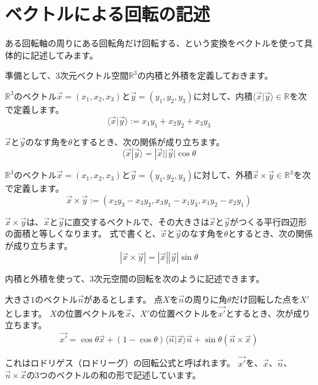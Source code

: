 \documentclass{jlreq}
\numberwithin{equation}{section}
\begin{document}
\section{ベクトルによる回転の記述}

ある回転軸の周りにある回転角だけ回転する、という変換をベクトルを使って具体的に記述してみます。

準備として、3次元ベクトル空間\(\mathbb{R}^3\)の内積と外積を定義しておきます。

\begin{definition}
    \(\mathbb{R}^3\)のベクトル\(\vec{x}=(x_1,x_2,x_3)\)と\(\vec{y}=(y_1,y_2,y_3)\)に対して、内積\(\langle\vec{x}|\vec{y}\rangle\in\mathbb{R}\)を次で定義します。
    \[
        \langle\vec{x}|\vec{y}\rangle:=x_1y_1+x_2y_2+x_3y_3
    \]
\end{definition}

\(\vec{x}\)と\(\vec{y}\)のなす角を\(\theta\)とするとき、次の関係が成り立ちます。
\[
    \langle\vec{x}|\vec{y}\rangle=|\vec{x}||\vec{y}|\cos\theta
\]

\begin{definition}
    \(\mathbb{R}^3\)のベクトル\(\vec{x}=(x_1,x_2,x_3)\)と\(\vec{y}=(y_1,y_2,y_3)\)に対して、外積\(\vec{x}\times\vec{y}\in\mathbb{R}^3\)を次で定義します。
    \[
        \vec{x}\times\vec{y}:=(x_2y_3-x_3y_2,x_3y_1-x_1y_3,x_1y_2-x_2y_1)
    \]
\end{definition}

\(\vec{x}\times\vec{y}\)は、\(\vec{x}\)と\(\vec{y}\)に直交するベクトルで、その大きさは\(\vec{x}\)と\(\vec{y}\)がつくる平行四辺形の面積と等しくなります。
式で書くと、\(\vec{x}\)と\(\vec{y}\)のなす角を\(\theta\)とするとき、次の関係が成り立ちます。
\[
    |\vec{x}\times\vec{y}|=|\vec{x}||\vec{y}|\sin\theta
\]

内積と外積を使って、3次元空間の回転を次のように記述できます。

\begin{theorem}\label{rotation_formula}
    大きさ\(1\)のベクトル\(\vec{n}\)があるとします。
    点\(X\)を\(\vec{n}\)の周りに角\(\theta\)だけ回転した点を\(X'\)とします。
    \(X\)の位置ベクトルを\(\vec{x}\)、\(X'\)の位置ベクトルを\(\vec{x'}\)とするとき、次が成り立ちます。
    \[
        \vec{x'}=\cos\theta\vec{x}+(1-\cos\theta)\langle\vec{n}|\vec{x}\rangle\vec{n}+\sin\theta(\vec{n}\times\vec{x})
    \]
\end{theorem}

これはロドリゲス（ロドリーグ）の回転公式と呼ばれます。
\(\vec{x'}\)を、\(\vec{x}\)、\(\vec{n}\)、\(\vec{n}\times\vec{x}\)の3つのベクトルの和の形で記述しています。
\end{document}
